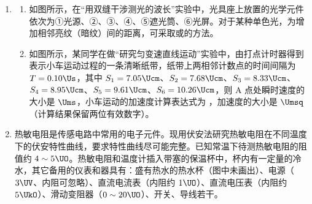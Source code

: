 \documentclass[\gkver]{gaokaozhenti}
\begin{document}
\begin{enumerate}
\item
\begin{enumerate}
	\item
	如图所示，在“用双缝干涉测光的波长”实验中，光具座上放置的光学元件依次为①光源、②、③、④、⑤遮光筒、⑥光屏。对于某种单色光，为增加相邻亮纹（暗纹）间的距离，可采取或的方法。


	\item
	如图所示，某同学在做“研究匀变速直线运动”实验中，由打点计时器得到表示小车运动过程的一条清晰纸带，纸带上两相邻计数点的时间间隔为 $T=0.10\Us$，其中 $S_{1}=7.05\Ucm$、$S_{2}=7.68\Ucm$、$S_{3}=8.33\Ucm$、$S_{4}=8.95\Ucm$、$S_{5}=9.61\Ucm$、$S_{6}=10.26\Ucm$，则 A 点处瞬时速度的大小是  $\Ums$，小车运动的加速度计算表达式为 ，加速度的大小是  $\Umsq$（计算结果保留两位有效数字）。

\end{enumerate}



\item
热敏电阻是传感电路中常用的电子元件。现用伏安法研究热敏电阻在不同温度下的伏安特性曲线，要求特性曲线尽可能完整。已知常温下待测热敏电阻的阻值约 $4\sim5\UO$。热敏电阻和温度计插入带塞的保温杯中，杯内有一定量的冷水，其它备用的仪表和器具有：盛有热水的热水杯（图中未画出）、电源（$3\UV$、内阻可忽略）、直流电流表（内阻约 $1\UO$）、直流电压表（内阻约 $5\UkO$）、滑动变阻器（$0\sim20\UO$）、开关、导线若干。


\end{enumerate}
\end{document}
